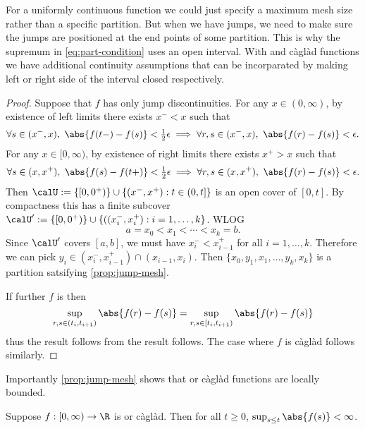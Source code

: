 \documentclass{scrreprt}
\theoremstyle{remark}
\newcommand{\caglad}{c\`agl\`ad}
\newcommand\defeq{:=}
\begin{document}
For a uniformly continuous function we could just specify a maximum mesh size rather than a specific partition. But when we have jumps, we need to make sure the jumps are positioned at the end points of some partition. This is why the supremum in \vref{eq:part-condition} uses an open interval. With \cadlag{} and \caglad{} functions we have additional continuity assumptions that can be incorparated by making left or right side of the interval closed respectively.

\begin{proof}
	Suppose that $f$ has only jump discontinuities. For any $x \in (0, \infty)$, by existence of left limits there exists $x^- < x$ such that
	\begin{equation}
		\forall s \in (x^-, x),\ \abs{f(t-) - f(s)} < \tfrac{1}{2} \epsilon \implies
		\forall r, s \in (x^-, x),\ \abs{f(r) - f(s)} < \epsilon.
	\end{equation}
	For any $x \in [0, \infty)$, by existence of right limits there exists $x^+ > x$ such that 
	\begin{equation}
		\forall s \in (x, x^+),\ \abs{f(s) - f(t+)} < \tfrac{1}{2} \epsilon \implies
		\forall r, s \in (x, x^+),\ \abs{f(r) - f(s)} < \epsilon.
	\end{equation}
	Then $\calU \defeq \{[0, 0^+)\} \cup \{(x^-, x^+) : t \in (0, t]\}$ is an open cover of $[0, t]$. By compactness this has a finite subcover $\calU' \defeq \{[0, 0^+)\} \cup \{((x_i^-, x_i^+) : i = 1, \ldots, k\}$. WLOG 
	\begin{equation}
		a = x_0 < x_1 < \cdots < x_k = b.
	\end{equation}
	Since $\calU'$ covers $[a, b]$, we must have $x_i^- < x_{i-1}^+$ for all $i = 1, \ldots, k$. Therefore we can pick $y_i \in (x_i^-, x_{i-1}^+) \cap (x_{i-1}, x_i)$. Then $\{x_0, y_1, x_1, \ldots, y_k, x_k\}$ is a partition satsifying \vref{prop:jump-mesh}.

	If further $f$ is \cadlag{} then 
	\begin{equation}
		\sup_{r, s \in (t_i, t_{i+1})} \abs{f(r) - f(s)} =
		\sup_{r, s \in [t_i, t_{i+1})} \abs{f(r) - f(s)}
	\end{equation}
	thus the result follows from the result follows. The case where $f$ is \caglad{} follows similarly.
\end{proof}

Importantly \vref{prop:jump-mesh} shows that \cadlag{} or \caglad{} functions are locally bounded.

\begin{corollary}
	Suppose $f: [0, \infty) \to \R$ is \cadlag{} or \caglad{}. Then for all $t \geq 0$, $\sup_{s \leq t} \abs{f(s)} < \infty$.
\end{corollary}
\end{document}
